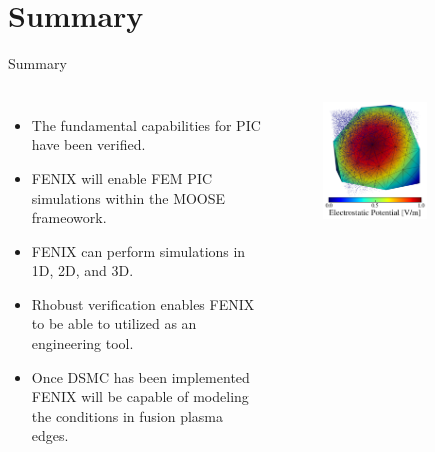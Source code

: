 \documentclass[aspectratio=169, 16pt]{beamer}
\begin{document}
\section{Summary}
\begin{frame}{Summary}
  \vfill{}
  \begin{columns}
    \begin{itemize}
      \item The fundamental capabilities for PIC have been verified.
      \item FENIX will enable FEM PIC simulations within the MOOSE frameowork.
      \item FENIX can perform simulations in 1D, 2D, and 3D.
      \item Rhobust verification enables FENIX to be able to utilized as an engineering tool.
      \item Once DSMC has been implemented FENIX will be capable of modeling the conditions in fusion plasma edges.
    \end{itemize}
    \begin{figure}[H]
      \includegraphics[width=0.7\textwidth]{figs/potential_visualiation.png}
     \end{figure}
  \end{columns}
\end{frame}
\begin{frame}
\end{frame}
%
\end{document}
